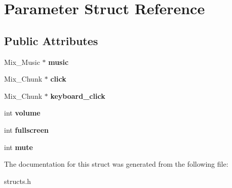 \hypertarget{structParameter}{}\section{Parameter Struct Reference}
\label{structParameter}
\subsection*{Public Attributes}
\begin{DoxyCompactItemize}
\item 
\mbox{\label{structParameter_aa7dbc1acec97da51a2a4e6346d890b4f}} 
Mix\+\_\+\+Music $\ast$ {\bfseries music}
\item 
\mbox{\label{structParameter_a48918a3e4a9514cffb9b59dd85c511cd}} 
Mix\+\_\+\+Chunk $\ast$ {\bfseries click}
\item 
\mbox{\label{structParameter_ae04ba3c3bdee5642a2d591e256823d3e}} 
Mix\+\_\+\+Chunk $\ast$ {\bfseries keyboard\+\_\+click}
\item 
\mbox{\label{structParameter_a8041ac8b22ef7c28648ae0d0ebc61698}} 
int {\bfseries volume}
\item 
\mbox{\label{structParameter_a51bd6883effe03e02ff0f262b47c724a}} 
int {\bfseries fullscreen}
\item 
\mbox{\label{structParameter_aacb7d19d4e42e7880c3606629b08bfa5}} 
int {\bfseries mute}
\end{DoxyCompactItemize}


The documentation for this struct was generated from the following file\+:\begin{DoxyCompactItemize}
\item 
structs.\+h\end{DoxyCompactItemize}
